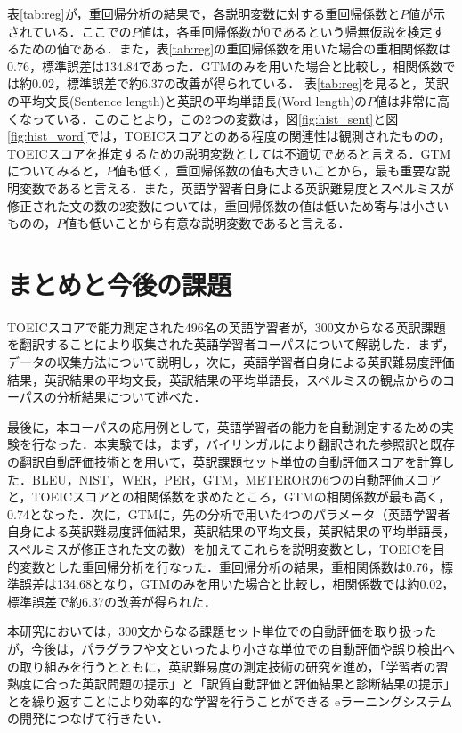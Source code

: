 \documentclass[japanese]{jnlp_1.4}
\begin{document}
表\ref{tab:reg}が，重回帰分析の結果で，各説明変数に対する重回帰係数と$P$値が示されている．ここでの$P$値は，各重回帰係数が0であるという帰無仮説を検定するための値である．また，表\ref{tab:reg}の重回帰係数を用いた場合の重相関係数は0.76，標準誤差は134.84であった．GTMのみを用いた場合と比較し，相関係数では約0.02，標準誤差で約6.37の改善が得られている．
表\ref{tab:reg}を見ると，英訳の平均文長(Sentence length)と英訳の平均単語長(Word length)の$P$値は非常に高くなっている．このことより，この2つの変数は，図\ref{fig:hist_sent}と図\ref{fig:hist_word}では，TOEICスコアとのある程度の関連性は観測されたものの，TOEICスコアを推定するための説明変数としては不適切であると言える．GTMについてみると，$P$値も低く，重回帰係数の値も大きいことから，最も重要な説明変数であると言える．また，英語学習者自身による英訳難易度とスペルミスが修正された文の数の2変数については，重回帰係数の値は低いため寄与は小さいものの，$P$値も低いことから有意な説明変数であると言える．

\section{まとめと今後の課題}
\label{sec:conc}

TOEICスコアで能力測定された496名の英語学習者が，300文からなる英訳課題を翻訳することにより収集された英語学習者コーパスについて解説した．まず，データの収集方法について説明し，次に，英語学習者自身による英訳難易度評価結果，英訳結果の平均文長，英訳結果の平均単語長，スペルミスの観点からのコーパスの分析結果について述べた．

最後に，本コーパスの応用例として，英語学習者の能力を自動測定するための実験を行なった．本実験では，まず，バイリンガルにより翻訳された参照訳と既存の翻訳自動評価技術とを用いて，英訳課題セット単位の自動評価スコアを計算した．BLEU，NIST，WER，PER，GTM，METERORの6つの自動評価スコアと，TOEICスコアとの相関係数を求めたところ，GTMの相関係数が最も高く，0.74となった．次に，GTMに，先の分析で用いた4つのパラメータ（英語学習者自身による英訳難易度評価結果，英訳結果の平均文長，英訳結果の平均単語長，スペルミスが修正された文の数）を加えてこれらを説明変数とし，TOEICを目的変数とした重回帰分析を行なった．重回帰分析の結果，重相関係数は0.76，標準誤差は134.68となり，GTMのみを用いた場合と比較し，相関係数では約0.02，標準誤差で約6.37の改善が得られた．

本研究においては，300文からなる課題セット単位での自動評価を取り扱ったが，今後は，パラグラフや文といったより小さな単位での自動評価や誤り検出への取り組みを行うとともに，英訳難易度の測定技術の研究を進め，「学習者の習熟度に合った英訳問題の提示」と「訳質自動評価と評価結果と診断結果の提示」とを繰り返すことにより効率的な学習を行うことができる eラーニングシステムの開発につなげて行きたい．
\end{document}
